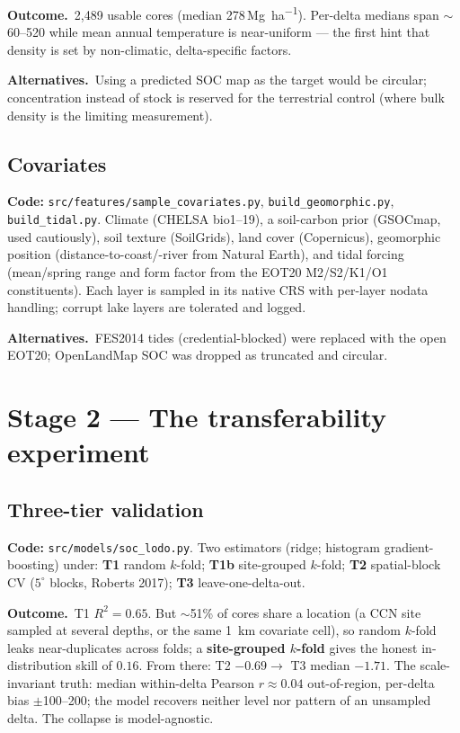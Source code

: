 \documentclass[11pt]{article}
\newcommand{\file}[1]{\texttt{\small #1}}
\newcommand{\out}{\textbf{\color{nb}Outcome.}\ }
\newcommand{\alt}{\textbf{\color{nb}Alternatives.}\ }
\begin{document}
\out 2{,}489 usable cores (median 278\,\si{\mega\gram\per\hectare}). Per-delta medians span
$\sim$60--520 while mean annual temperature is near-uniform --- the first hint that density is
set by non-climatic, delta-specific factors.

\alt Using a predicted SOC map as the target would be circular; concentration instead of
stock is reserved for the terrestrial control (where bulk density is the limiting measurement).

\subsection{Covariates}
\textbf{Code:} \file{src/features/sample\_covariates.py}, \file{build\_geomorphic.py},
\file{build\_tidal.py}. Climate (CHELSA bio1--19), a soil-carbon prior (GSOCmap, used
cautiously), soil texture (SoilGrids), land cover (Copernicus), geomorphic position
(distance-to-coast/-river from Natural Earth), and tidal forcing (mean/spring range and form
factor from the EOT20 M2/S2/K1/O1 constituents). Each layer is sampled in its native CRS with
per-layer nodata handling; corrupt lake layers are tolerated and logged.

\alt FES2014 tides (credential-blocked) were replaced with the open EOT20; OpenLandMap SOC was
dropped as truncated and circular.

\section{Stage 2 --- The transferability experiment}
\subsection{Three-tier validation}
\textbf{Code:} \file{src/models/soc\_lodo.py}. Two estimators (ridge; histogram
gradient-boosting) under: \textbf{T1} random $k$-fold; \textbf{T1b} site-grouped $k$-fold;
\textbf{T2} spatial-block CV ($5^\circ$ blocks, Roberts 2017); \textbf{T3}
leave-one-delta-out.

\out T1 $R^2=0.65$. But $\sim$51\% of cores share a location (a CCN site sampled at several
depths, or the same 1~km covariate cell), so random $k$-fold leaks near-duplicates across
folds; a \textbf{site-grouped $k$-fold} gives the honest in-distribution skill of $0.16$.
From there: T2 $-0.69 \to$ T3 median $-1.71$. The scale-invariant truth: median within-delta
Pearson $r\approx0.04$ out-of-region, per-delta bias $\pm$100--200; the model recovers neither
level nor pattern of an unsampled delta. The collapse is model-agnostic.
\end{document}
